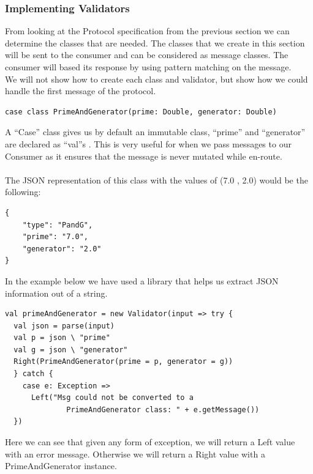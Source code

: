 \subsubsection{Implementing Validators}
From looking at the Protocol specification from the previous section we can determine the classes that are needed. The classes that we create in this section will be sent to the consumer and can be considered as message classes. The consumer will based its response by using pattern matching on the message.
\\
We will not show how to create each class and validator, but show how we could handle the first message of the protocol.
\begin{lstlisting}[style=myScalastyle]
 case class PrimeAndGenerator(prime: Double, generator: Double)
\end{lstlisting}
A ``Case'' class gives us by default an immutable class, ``prime'' and ``generator'' are declared as ``val''s . This is very useful for when we pass messages to our Consumer as it ensures that the message is never mutated while en-route.
\\\\
The JSON representation of this class with the values of (7.0 , 2.0) would be the following:
\begin{lstlisting}[style=myScalastyle]
{
    "type": "PandG",
    "prime": "7.0",
    "generator": "2.0"
}
\end{lstlisting}
In the example below we have used a library that helps us extract JSON information out of a string. 

\begin{lstlisting}[style=myScalastyle]
  val primeAndGenerator = new Validator(input => try {
  val json = parse(input)
  val p = json \ "prime"  
  val g = json \ "generator"
  Right(PrimeAndGenerator(prime = p, generator = g))
  } catch {
    case e: Exception =>
      Left("Msg could not be converted to a 
              PrimeAndGenerator class: " + e.getMessage())
  })
\end{lstlisting}
Here we can see that given any form of exception, we will return a Left value with an error message. Otherwise we will return a Right value with a PrimeAndGenerator instance.

